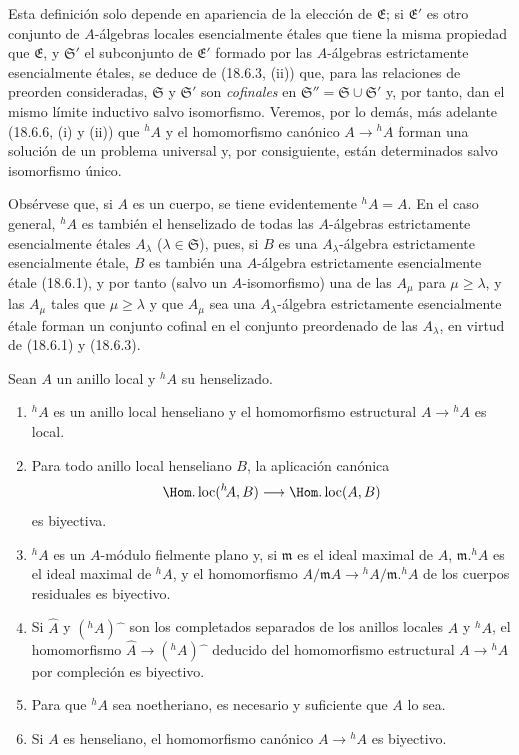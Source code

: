 Esta definición solo depende en apariencia de la elección de $\mathfrak E$; si $\mathfrak E'$ es otro conjunto de $A$-álgebras locales esencialmente étales que tiene la misma propiedad que $\mathfrak E$, y $\mathfrak S'$ el subconjunto de $\mathfrak E'$ formado por las $A$-álgebras estrictamente esencialmente étales, se deduce de (18.6.3, (ii)) que, para las relaciones de preorden consideradas, $\mathfrak S$ y $\mathfrak S'$ son \emph{cofinales} en $\mathfrak S''=\mathfrak S\cup\mathfrak S'$ y, por tanto, dan el mismo límite inductivo salvo isomorfismo. Veremos, por lo demás, más adelante (18.6.6, (i) y (ii)) que ${}^h\!A$ y el homomorfismo canónico $A\to{}^h\!A$ forman una solución de un problema universal y, por consiguiente, están determinados salvo isomorfismo único.

Obsérvese que, si $A$ es un cuerpo, se tiene evidentemente ${}^h\!A=A$. En el caso general, ${}^h\!A$ es también el henselizado de todas las $A$-álgebras estrictamente esencialmente étales $A_\lambda$ ($\lambda\in\mathfrak S$), pues, si $B$ es una $A_\lambda$-álgebra estrictamente esencialmente étale, $B$ es también una $A$-álgebra estrictamente esencialmente étale (18.6.1), y por tanto (salvo un $A$-isomorfismo) una de las $A_\mu$ para $\mu\geq\lambda$, y las $A_\mu$ tales que $\mu\geq\lambda$ y que $A_\mu$ sea una $A_\lambda$-álgebra estrictamente esencialmente étale forman un conjunto cofinal en el conjunto preordenado de las $A_\lambda$, en virtud de (18.6.1) y (18.6.3).

\begin{theorem}[18.6.6]
\label{IV.18.6.6}
Sean $A$ un anillo local y ${}^h\!A$ su henselizado.
\begin{enumerate}
  \item[\textup{(i)}] ${}^h\!A$ es un anillo local henseliano y el homomorfismo estructural $A\to{}^h\!A$ es local.
  \item[\textup{(ii)}] Para todo anillo local henseliano $B$, la aplicación canónica
  \[
    \Hom.\operatorname{loc}({}^h\!A,B)\longrightarrow\Hom.\operatorname{loc}(A,B)
  \]
  es biyectiva.
  \item[\textup{(iii)}] ${}^h\!A$ es un $A$-módulo fielmente plano y, si $\mathfrak m$ es el ideal maximal de $A$, $\mathfrak m.{}^h\!A$ es el ideal maximal de ${}^h\!A$, y el homomorfismo $A/\mathfrak mA\to{}^h\!A/\mathfrak m.{}^h\!A$ de los cuerpos residuales es biyectivo.
  \item[\textup{(iv)}] Si $\widehat A$ y $({}^h\!A)\widehat{\phantom{x}}$ son los completados separados de los anillos locales $A$ y ${}^h\!A$, el homomorfismo $\widehat A\to({}^h\!A)\widehat{\phantom{x}}$ deducido del homomorfismo estructural $A\to{}^h\!A$ por compleción es biyectivo.
  \item[\textup{(v)}] Para que ${}^h\!A$ sea noetheriano, es necesario y suficiente que $A$ lo sea.
  \item[\textup{(vi)}] Si $A$ es henseliano, el homomorfismo canónico $A\to{}^h\!A$ es biyectivo.
\end{enumerate}
\end{theorem}

